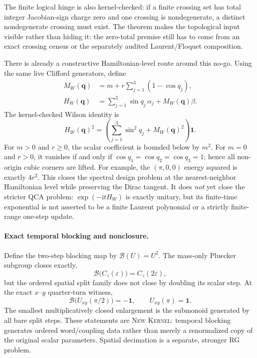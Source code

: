 \documentclass[11pt]{article}
\newcommand{\Kernel}{\textcolor{kernelcolor}{\textsc{Kernel}}}
\newcommand{\NewResult}{\textsc{New}}
\newcommand{\ii}{\mathrm{i}}
\newcommand{\id}{\mathbf{1}}
\begin{document}
The finite logical hinge is also kernel-checked: if a finite crossing set has
total integer Jacobian-sign charge zero and one crossing is nondegenerate, a
distinct nondegenerate crossing must exist.  The theorem makes the topological
input visible rather than hiding it: the zero-total premise still has to come
from an exact crossing census or the separately audited Laurent/Floquet
composition.

There is already a constructive Hamiltonian-level route around this no-go.
Using the same live Clifford generators, define
\begin{align}
 M_W(\mathbf q)&=m+r\sum_{j=1}^{3}(1-\cos q_j),\\
 H_W(\mathbf q)&=\sum_{j=1}^{3}\sin q_j\,\alpha_j+M_W(\mathbf q)\beta.
\end{align}
The kernel-checked Wilson identity is
\begin{equation}\label{eq:wilsonsquare}
 H_W(\mathbf q)^2=
 \left(\sum_{j=1}^{3}\sin^2q_j+M_W(\mathbf q)^2\right)\id.
\end{equation}
For $m>0$ and $r\geq0$, the scalar coefficient is bounded below by $m^2$.
For $m=0$ and $r>0$, it vanishes if and only if
$\cos q_1=\cos q_2=\cos q_3=1$; hence all non-origin cubic corners are lifted.
For example, the $(\pi,0,0)$ energy squared is exactly $4r^2$.  This closes
the spectral design problem at the nearest-neighbor Hamiltonian level while
preserving the Dirac tangent.  It does \emph{not} yet close the stricter QCA
problem: $\exp(-\ii tH_W)$ is exactly unitary, but its finite-time exponential
is not asserted to be a finite Laurent polynomial or a strictly finite-range
one-step update.

\paragraph{Exact temporal blocking and nonclosure.}
Define the two-step blocking map by $\mathcal B(U)=U^2$.  The mass-only
Pluecker subgroup closes exactly,
\[
 \mathcal B\bigl(C_z(\varepsilon)\bigr)=C_z(2\varepsilon),
\]
but the ordered spatial split family does not close by doubling its scalar
step.  At the exact $x$--$y$ quarter-turn witness,
\begin{equation}\label{eq:rgcounterexample}
 \mathcal B\bigl(U_{xy}(\pi/2)\bigr)=-\id,
 \qquad U_{xy}(\pi)=\id.
\end{equation}
The smallest multiplicatively closed enlargement is the submonoid generated
by all bare split steps.  These statements are \NewResult{} \Kernel{}: temporal
blocking generates ordered word/coupling data rather than merely a
renormalized copy of the original scalar parameters.  Spatial decimation is a
separate, stronger RG problem.
\end{document}
